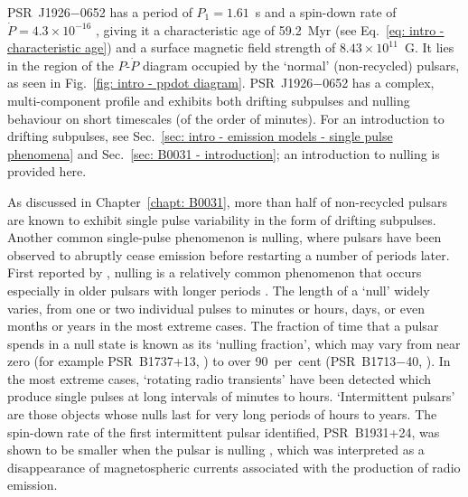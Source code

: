 PSR~J1926$-$0652 has a period of $P_1=1.61$~s and a spin-down rate of $\dot{P} = 4.3\times10^{-16}$ \citep{ZLH+2019}, giving it a characteristic age of 59.2~Myr (see Eq.~\eqref{eq: intro - characteristic age}) and a surface magnetic field strength of $8.43\times10^{11}$~G. It lies in the region of the $P$-$\dot{P}$ diagram occupied by the `normal' (non-recycled) pulsars, as seen in Fig.~\ref{fig: intro - ppdot diagram}. PSR~J1926$-$0652 has a complex, multi-component profile and exhibits both drifting subpulses and nulling behaviour on short timescales (of the order of minutes). For an introduction to drifting subpulses, see Sec.~\ref{sec: intro - emission models - single pulse phenomena} and Sec.~\ref{sec: B0031 - introduction}; an introduction to nulling is provided here.

As discussed in Chapter~\ref{chapt: B0031}, more than half of non-recycled pulsars are known to exhibit single pulse variability in the form of drifting subpulses. Another common single-pulse phenomenon is nulling, where pulsars have been observed to abruptly cease emission before restarting a number of periods later. First reported by \citet{Bxxx1970b}, nulling is a relatively common phenomenon that occurs especially in older pulsars with longer periods \citep{Rxxx1986}. The length of a `null' widely varies, from one or two individual pulses to minutes or hours, days, or even months or years in the most extreme cases. The fraction of time that a pulsar spends in a null state is known as its `nulling fraction', which may vary from near zero (for example PSR~B1737+13, \citealt{Bxxx1992}) to over 90~per~cent (PSR~B1713$-$40, \citealt{WMJx2007}). In the most extreme cases, `rotating radio transients' \citep[RRATS;][]{MLL+2006} have been detected which produce single pulses at long intervals of minutes to hours. `Intermittent pulsars' are those objects whose nulls last for very long periods of hours to years. The spin-down rate of the first intermittent pulsar identified, PSR~B1931+24, was shown to be smaller when the pulsar is nulling \citep{KLO+2006}, which was interpreted as a disappearance of magnetospheric currents associated with the production of radio emission.


